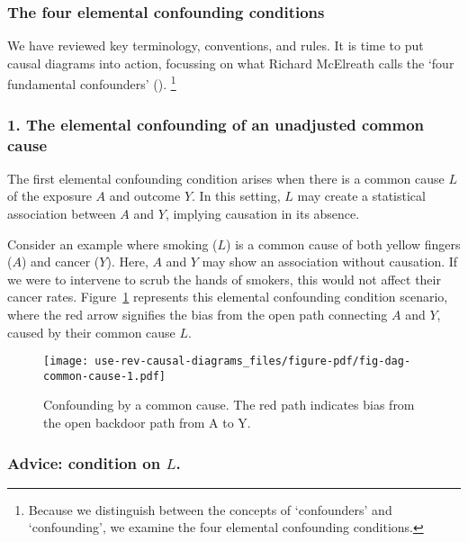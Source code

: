 \documentclass[
  singlecolumn,
  9pt]{article}
\begin{document}
\subsubsection{The four elemental confounding
conditions}\label{the-four-elemental-confounding-conditions}

We have reviewed key terminology, conventions, and rules. It is time to
put causal diagrams into action, focussing on what Richard McElreath
calls the `four fundamental confounders'
(). \footnote{Because
  we distinguish between the concepts of `confounders' and
  `confounding', we examine the four elemental confounding conditions.}

\subsubsection{1. The elemental confounding of an unadjusted common
cause}\label{the-elemental-confounding-of-an-unadjusted-common-cause}

The first elemental confounding condition arises when there is a common
cause \(L\) of the exposure \(A\) and outcome \(Y\). In this setting,
\(L\) may create a statistical association between \(A\) and \(Y\),
implying causation in its absence.

Consider an example where smoking (\(L\)) is a common cause of both
yellow fingers (\(A\)) and cancer (\(Y\)). Here, \(A\) and \(Y\) may
show an association without causation. If we were to intervene to scrub
the hands of smokers, this would not affect their cancer rates.
Figure~\ref{fig-dag-common-cause} represents this elemental confounding
condition scenario, where the red arrow signifies the bias from the open
path connecting \(A\) and \(Y\), caused by their common cause \(L\).

\begin{figure}

{\centering \texttt{[image: use-rev-causal-diagrams\_files/figure-pdf/fig-dag-common-cause-1.pdf]}

}

\caption{\label{fig-dag-common-cause}Confounding by a common cause. The
red path indicates bias from the open backdoor path from A to Y.}

\end{figure}

\subsubsection{\texorpdfstring{Advice: condition on
\(L\).}{Advice: condition on L.}}\label{advice-condition-on-l.}
\end{document}
